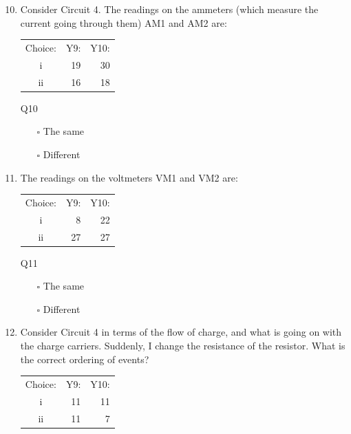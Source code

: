 \documentclass[a4paper,openany,nobib]{tufte-book}
\begin{document}
\begin{enumerate}
		\setcounter{enumi}{9}
		\item Consider Circuit 4. The readings on the ammeters (which measure the current going through them) AM1 and AM2 are:
			\begin{margintable}
			\begin{center}
			\begin{tabular}{crr}
			\toprule
			 Choice: & Y9: & Y10:\\
			 i & 19 & 30\\
			 ii & 16 & 18\\
			 \bottomrule
			\end{tabular}
			\caption{\centering Q10}
			\end{center}
			\end{margintable}
		\begin{itemize}
			\item[$\square$] The same
			\item[$\square$] Different
		\end{itemize}
	\item The readings on the voltmeters VM1 and VM2 are:
		\begin{margintable}[0cm]
		\begin{center}
		\begin{tabular}{crr}
		\toprule
		 Choice: & Y9: & Y10:\\
		 i & 8 & 22\\
		 ii & 27 & 27\\
		 \bottomrule
		\end{tabular}
		\caption{\centering Q11}
		\end{center}
		\end{margintable}
		\begin{itemize}
			\item[$\square$] The same
			\item[$\square$] Different
		\end{itemize}
	\item Consider Circuit 4 in terms of the flow of charge, and what is going on with the charge carriers. Suddenly, I change the resistance of the resistor. What is the correct ordering of events?
		\begin{margintable}
		\begin{center}
		\begin{tabular}{crr}
		\toprule
		 Choice: & Y9: & Y10:\\
		 i & 11 & 11\\
		 ii & 11 & 7\\

\end{tabular}
\end{center}
\end{margintable}
\end{enumerate}
\end{document}
